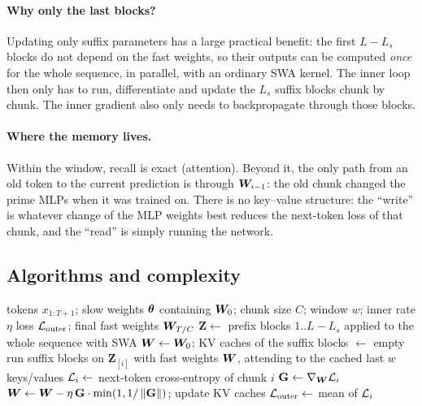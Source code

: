 \paragraph{Why only the last blocks?} Updating only suffix parameters has a large practical
benefit: the first $L - L_s$ blocks do not depend on the fast weights, so their outputs can be
computed \emph{once} for the whole sequence, in parallel, with an ordinary SWA kernel. The
inner loop then only has to run, differentiate and update the $L_s$ suffix blocks chunk by
chunk. The inner gradient also only needs to backpropagate through those blocks.

\paragraph{Where the memory lives.} Within the window, recall is exact (attention). Beyond it,
the only path from an old token to the current prediction is through $\bm{W}_{i-1}$: the old
chunk changed the prime MLPs when it was trained on. There is no key--value structure: the
``write'' is whatever change of the MLP weights best reduces the next-token loss of that chunk,
and the ``read'' is simply running the network.

\subsection{Algorithms and complexity}

\begin{algorithm}[t]
\caption{TTT-E2E on one sequence (training, prefill and evaluation all run this).}
\label{alg:c09-e2e}
\begin{algorithmic}[1]
\Require tokens $x_{1:T+1}$; slow weights $\bm{\theta}$ containing $\bm{W}_0$; chunk size $C$; window $w$; inner rate $\eta$
\Ensure loss $\mathcal{L}_{\text{outer}}$; final fast weights $\bm{W}_{T/C}$
\State $\mathbf{Z} \gets$ prefix blocks $1..L-L_s$ applied to the whole sequence with SWA 
\State $\bm{W} \gets \bm{W}_0$; KV caches of the suffix blocks $\gets$ empty
  \State run suffix blocks on $\mathbf{Z}_{[i]}$ with fast weights $\bm{W}$, attending to the cached last $w$ keys/values
  \State $\mathcal{L}_i \gets$ next-token cross-entropy of chunk $i$
  \State $\mathbf{G} \gets \nabla_{\bm{W}}\mathcal{L}_i$ 
  \State $\bm{W} \gets \bm{W} - \eta\,\mathbf{G}\cdot\min(1, 1/\left\lVert \mathbf{G}\right\rVert)$; update KV caches
\EndFor
\State $\mathcal{L}_{\text{outer}} \gets$ mean of $\mathcal{L}_i$ 
\end{algorithmic}
\end{algorithm}

